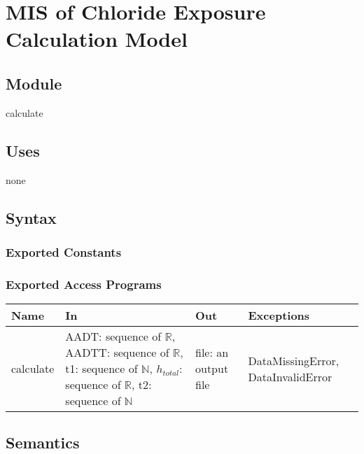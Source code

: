 \documentclass[12pt, titlepage]{article}
\begin{document}
\section{MIS of Chloride Exposure Calculation Model} \label{calculationModule} 



\subsection{Module}

calculate

\subsection{Uses}

none

\subsection{Syntax}

\subsubsection{Exported Constants}

\subsubsection{Exported Access Programs}

\begin{center}
\begin{tabular}{p{2cm} p{4cm} p{4cm} p{4cm}}
\hline
\textbf{Name} & \textbf{In} & \textbf{Out} & \textbf{Exceptions} \\
\hline
calculate & AADT: sequence of $\mathbb{R}$, AADTT: sequence of $\mathbb{R}$, t1: sequence of $\mathbb{N}$, $h_{total}$: sequence of $\mathbb{R}$, t2: sequence of $\mathbb{N}$ & file: an output file & DataMissingError, DataInvalidError \\
\hline
\end{tabular}
\end{center}

\subsection{Semantics}
\end{document}
